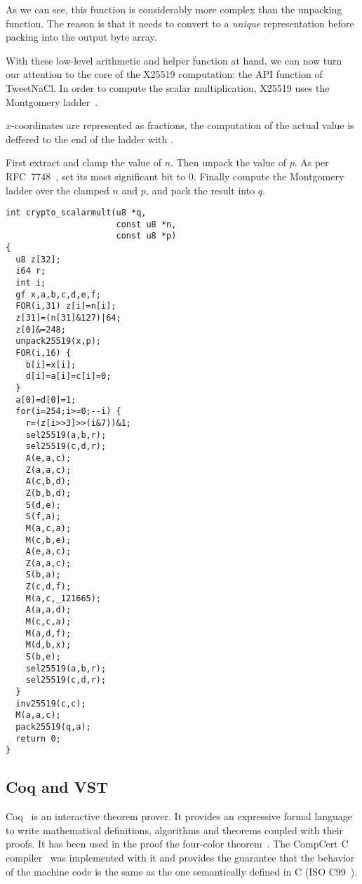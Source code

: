 As we can see, this function is considerably more complex than the
unpacking function. The reason is that it needs to convert
to a \emph{unique} representation before packing into the output
byte array.

With these low-level arithmetic and helper function at hand, we can now
turn our attention to the core of the X25519 computation:
the  API function of TweetNaCl.
In order to compute the scalar multiplication,
X25519 uses the Montgomery ladder~\cite{Mon85}.

$x$-coordinates are represented as fractions, the computation of the actual
value is deffered to the end of the ladder with .

First extract and clamp the value of $n$. Then unpack the value of $p$.
As per RFC~7748~\cite{rfc7748}, set its most significant bit to 0.
Finally compute the Montgomery ladder over the clamped $n$ and $p$,
and pack the result into $q$.
\begin{lstlisting}[language=Ctweetnacl]
int crypto_scalarmult(u8 *q,
                      const u8 *n,
                      const u8 *p)
{
  u8 z[32];
  i64 r;
  int i;
  gf x,a,b,c,d,e,f;
  FOR(i,31) z[i]=n[i];
  z[31]=(n[31]&127)|64;
  z[0]&=248;
  unpack25519(x,p);
  FOR(i,16) {
    b[i]=x[i];
    d[i]=a[i]=c[i]=0;
  }
  a[0]=d[0]=1;
  for(i=254;i>=0;--i) {
    r=(z[i>>3]>>(i&7))&1;
    sel25519(a,b,r);
    sel25519(c,d,r);
    A(e,a,c);
    Z(a,a,c);
    A(c,b,d);
    Z(b,b,d);
    S(d,e);
    S(f,a);
    M(a,c,a);
    M(c,b,e);
    A(e,a,c);
    Z(a,a,c);
    S(b,a);
    Z(c,d,f);
    M(a,c,_121665);
    A(a,a,d);
    M(c,c,a);
    M(a,d,f);
    M(d,b,x);
    S(b,e);
    sel25519(a,b,r);
    sel25519(c,d,r);
  }
  inv25519(c,c);
  M(a,a,c);
  pack25519(q,a);
  return 0;
}
\end{lstlisting}

\subsection{Coq and VST}
\label{subsec:Coq-VST}

Coq~\cite{coq-faq} is an interactive theorem prover. It provides an expressive
formal language to write mathematical definitions, algorithms and theorems coupled
with their proofs. It has been used in the proof the four-color theorem~\cite{gonthier2008formal}.
The CompCert C compiler~\cite{Leroy-backend} was implemented with it and provides
the guarantee that the behavior of the machine code is the same as the one
semantically defined in C (ISO C99~\cite{ISO:C99}).

